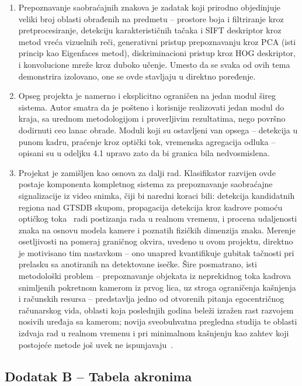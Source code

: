 \documentclass[11pt,a4paper]{article}
\begin{document}
\begin{enumerate}
	\item Prepoznavanje saobraćajnih znakova je zadatak koji prirodno objedinjuje veliki broj oblasti obrađenih na predmetu -- prostore boja i filtriranje kroz pretprocesiranje, detekciju karakterističnih tačaka i SIFT deskriptor kroz metod vreća vizuelnih reči, generativni pristup prepoznavanju kroz PCA (isti princip kao Eigenfaces metod), diskriminacioni pristup kroz HOG deskriptor, i konvolucione mreže kroz duboko učenje. Umesto da se svaka od ovih tema demonstrira izolovano, one se ovde stavljaju u direktno poređenje.

	\item Opseg projekta je namerno i eksplicitno ograničen na jedan modul šireg sistema. Autor smatra da je pošteno i korisnije realizovati jedan modul do kraja, sa urednom metodologijom i proverljivim rezultatima, nego površno dodirnuti ceo lanac obrade. Moduli koji su ostavljeni van opsega -- detekcija u punom kadru, praćenje kroz optički tok, vremenska agregacija odluka -- opisani su u odeljku 4.1 upravo zato da bi granica bila nedvosmislena.

	\item Projekat je zamišljen kao osnova za dalji rad. Klasifikator razvijen ovde postaje komponenta kompletnog sistema za prepoznavanje saobraćajne signalizacije iz video snimka, čiji bi naredni koraci bili: detekcija kandidatnih regiona nad GTSDB skupom, propagacija detekcija kroz kadrove pomoću optičkog toka~\cite{lucas-kanade} radi postizanja rada u realnom vremenu, i procena udaljenosti znaka na osnovu modela kamere i poznatih fizičkih dimenzija znaka. Merenje osetljivosti na pomeraj graničnog okvira, uvedeno u ovom projektu, direktno je motivisano tim nastavkom -- ono unapred kvantifikuje gubitak tačnosti pri prelasku sa anotiranih na detektovane isečke. Šire posmatrano, isti metodološki problem -- prepoznavanje objekata iz neprekidnog
toka kadrova snimljenih pokretnom kamerom iz prvog lica, uz stroga ograničenja
kašnjenja i računskih resursa -- predstavlja jedno od otvorenih pitanja egocentričnog
računarskog vida, oblasti koja poslednjih godina beleži izražen rast razvojem nosivih
uređaja sa kamerom; novija sveobuhvatna pregledna studija te oblasti izdvaja rad u
realnom vremenu i pri minimalnom kašnjenju kao zahtev koji postojeće metode još uvek
ne ispunjavaju~\cite{ego-survey}.
\end{enumerate}

\subsection*{Dodatak B -- Tabela akronima}
\end{document}
